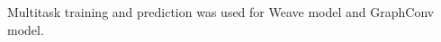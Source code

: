 \documentclass[book.tex]{subfiles}
\begin{document}




Multitask training and prediction was used for Weave model and GraphConv model. 
\end{document}
